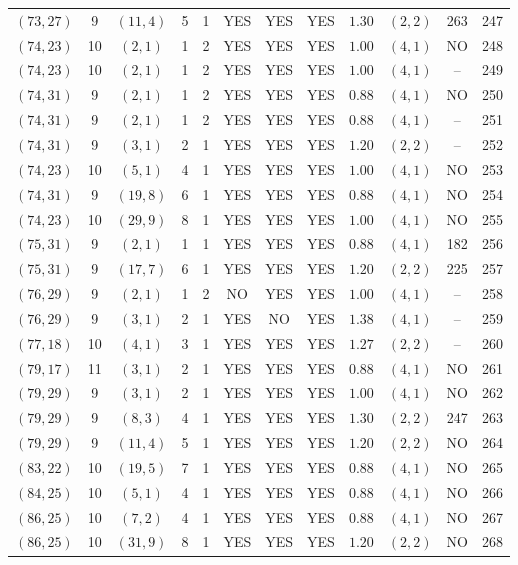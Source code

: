 \begin{longtable}{|c|c|c|c|c|c|c|c|c|c|c|c|}
$(73,27)$ & 9 & $(11,4)$ & 5 & 1 & YES & YES & YES & $1.30$ & $(2,2)$ & 263 & 247\\
$(74,23)$ & 10 & $(2,1)$ & 1 & 2 & YES & YES & YES & $1.00$ & $(4,1)$ & NO & 248\\
$(74,23)$ & 10 & $(2,1)$ & 1 & 2 & YES & YES & YES & $1.00$ & $(4,1)$ & -- & 249\\
$(74,31)$ & 9 & $(2,1)$ & 1 & 2 & YES & YES & YES & $0.88$ & $(4,1)$ & NO & 250\\
$(74,31)$ & 9 & $(2,1)$ & 1 & 2 & YES & YES & YES & $0.88$ & $(4,1)$ & -- & 251\\
$(74,31)$ & 9 & $(3,1)$ & 2 & 1 & YES & YES & YES & $1.20$ & $(2,2)$ & -- & 252\\
$(74,23)$ & 10 & $(5,1)$ & 4 & 1 & YES & YES & YES & $1.00$ & $(4,1)$ & NO & 253\\
$(74,31)$ & 9 & $(19,8)$ & 6 & 1 & YES & YES & YES & $0.88$ & $(4,1)$ & NO & 254\\
$(74,23)$ & 10 & $(29,9)$ & 8 & 1 & YES & YES & YES & $1.00$ & $(4,1)$ & NO & 255\\
$(75,31)$ & 9 & $(2,1)$ & 1 & 1 & YES & YES & YES & $0.88$ & $(4,1)$ & 182 & 256\\
$(75,31)$ & 9 & $(17,7)$ & 6 & 1 & YES & YES & YES & $1.20$ & $(2,2)$ & 225 & 257\\
$(76,29)$ & 9 & $(2,1)$ & 1 & 2 & NO & YES & YES & $1.00$ & $(4,1)$ & -- & 258\\
$(76,29)$ & 9 & $(3,1)$ & 2 & 1 & YES & NO & YES & $1.38$ & $(4,1)$ & -- & 259\\
$(77,18)$ & 10 & $(4,1)$ & 3 & 1 & YES & YES & YES & $1.27$ & $(2,2)$ & -- & 260\\
$(79,17)$ & 11 & $(3,1)$ & 2 & 1 & YES & YES & YES & $0.88$ & $(4,1)$ & NO & 261\\
$(79,29)$ & 9 & $(3,1)$ & 2 & 1 & YES & YES & YES & $1.00$ & $(4,1)$ & NO & 262\\
$(79,29)$ & 9 & $(8,3)$ & 4 & 1 & YES & YES & YES & $1.30$ & $(2,2)$ & 247 & 263\\
$(79,29)$ & 9 & $(11,4)$ & 5 & 1 & YES & YES & YES & $1.20$ & $(2,2)$ & NO & 264\\
$(83,22)$ & 10 & $(19,5)$ & 7 & 1 & YES & YES & YES & $0.88$ & $(4,1)$ & NO & 265\\
$(84,25)$ & 10 & $(5,1)$ & 4 & 1 & YES & YES & YES & $0.88$ & $(4,1)$ & NO & 266\\
$(86,25)$ & 10 & $(7,2)$ & 4 & 1 & YES & YES & YES & $0.88$ & $(4,1)$ & NO & 267\\
$(86,25)$ & 10 & $(31,9)$ & 8 & 1 & YES & YES & YES & $1.20$ & $(2,2)$ & NO & 268\\

\end{longtable}
